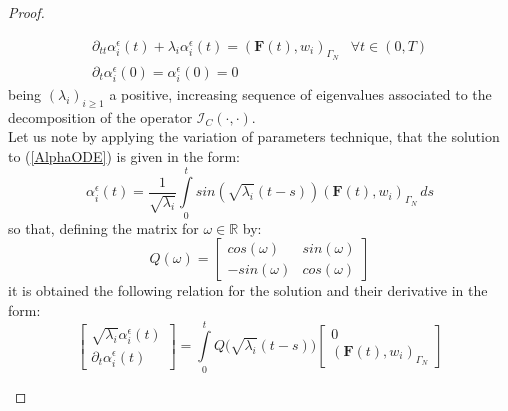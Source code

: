 \begin{proof}
\begin{enumerate}
    \begin{equation}
        \label{AlphaODE}
        \begin{array}{cc}
            \partial_{tt} \alpha_i^{\epsilon}(t) + \lambda_i \alpha_i^{\epsilon}(t) = (\mathbf{F}(t),w_i)_{\Gamma_N}& \forall t \in (0,T) \\
            \partial_t \alpha_i^{\epsilon}(0) = \alpha_i^{\epsilon}(0) = 0 & 
        \end{array}
    \end{equation}
    being $(\lambda_i)_{i \geq 1}$ a positive, increasing sequence of eigenvalues associated to the decomposition of the operator $\mathcal{I}_C(\cdot, \cdot)$.\\
    Let us note by applying the variation of parameters technique, that the solution to (\ref{AlphaODE}) is given in the form:
    \begin{equation}
        \label{AlphaODEsol}
        \alpha_i^{\epsilon} (t) = \frac{1}{\sqrt{\lambda_i}} \int\limits_0^t sin(\sqrt{\lambda_i} (t-s)) (\mathbf{F}(t),w_i)_{\Gamma_N} \, ds
    \end{equation}
    so that, defining the matrix for $\omega \in \mathbb{R}$ by:
    \begin{equation*}
        Q(\omega) =
        \begin{bmatrix}
        cos(\omega) & sin(\omega) \\
        -sin(\omega) & cos(\omega)
        \end{bmatrix}
    \end{equation*}
    it is obtained the following relation for the solution and their derivative in the form:
    \begin{equation}
        \label{MatrixODEsol}
        \begin{bmatrix}
        \sqrt{\lambda_i} \alpha_i^{\epsilon}(t) \\
        \partial_{t} \alpha_i^{\epsilon}(t) 
        \end{bmatrix}
        = \int \limits_0^t Q\big(\sqrt{\lambda_i}(t-s)\big)
        \begin{bmatrix}
        0 \\
        (\mathbf{F}(t),w_i)_{\Gamma_N}
        \end{bmatrix}
    \end{equation}
    

\end{enumerate}
\end{proof}
